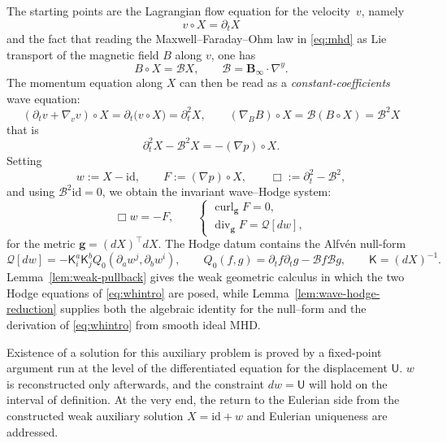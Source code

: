 \documentclass[11pt,reqno]{amsart}
\theoremstyle{plain}
\theoremstyle{definition}
\theoremstyle{remark}
\numberwithin{equation}{section}
\DeclareMathOperator{\Div}{div}
\DeclareMathOperator{\curl}{curl}
\newcommand{\Ufield}{\mathsf U}
\newcommand{\Kmat}{\mathsf K}
\newcommand{\gmetric}{\mathbf g}
\newcommand{\Binf}{\mathbf B_\infty}
\begin{document}
The starting points are the Lagrangian flow equation for the velocity~$v$, namely
\[
 v\circ X=\partial_t X
\]
and the fact that reading the Maxwell--Faraday--Ohm law in \eqref{eq:mhd} as Lie transport of the magnetic field $B$ along $v$, one has
\[
 B\circ X=\mathcal BX,
 \qquad \mathcal B=\Binf\cdot\nabla^y.
\]
The momentum equation along $X$ can then be read as a \emph{constant-coefficients} wave equation:  
\[
 (\partial_tv+\nabla_vv)\circ X=\partial_t\big(v\circ X\big)=\partial_t^2X, \qquad (\nabla_BB)\circ X= \mathcal B(B\circ X)=\mathcal B^2X
\]
that is
\[
    \partial_t^2X-\mathcal B^2X=-(\nabla p)\circ X.
\]
Setting
\[
 w:=X-\mathrm{id},\qquad
 F:=(\nabla p)\circ X,\qquad
 \Box:=\partial_t^2-\mathcal B^2,
\]
and using $\mathcal B^2\mathrm{id}=0$, we obtain the invariant
wave--Hodge system:
\begin{equation}\label{eq:whintro}
 \Box w=-F,\qquad 
    \begin{cases}
        \curl_{\gmetric}F=0,\\
        \Div_{\gmetric}F=\mathcal Q[dw],
    \end{cases}
\end{equation}
for the metric $\gmetric=(dX)^{\top}dX$. The Hodge datum contains the Alfv\'en null-form
\[
 \mathcal Q[dw]
 =-\Kmat^a_i\Kmat^b_jQ_0(\partial_aw^j,\partial_bw^i),
 \qquad
 Q_0(f,g)=\partial_tf \partial_tg-\mathcal Bf \mathcal Bg, \qquad \Kmat=(d X)^{-1}.
\]
Lemma~\ref{lem:weak-pullback} gives the weak geometric calculus in which the
two Hodge equations of \eqref{eq:whintro} are posed, while
Lemma~\ref{lem:wave-hodge-reduction} supplies both the algebraic identity for the null--form and the derivation of \eqref{eq:whintro} from
smooth ideal MHD. 

Existence of a solution for this auxiliary problem is proved by a fixed-point argument run at the level of the differentiated equation for the displacement
$\Ufield$. $w$ is reconstructed only afterwards, and the constraint $dw=\Ufield$ will hold on the interval of definition. At the very end, the return to the Eulerian side from the constructed weak auxiliary solution $X=\mathrm{id}+w$ and Eulerian uniqueness are addressed.\\
\end{document}
